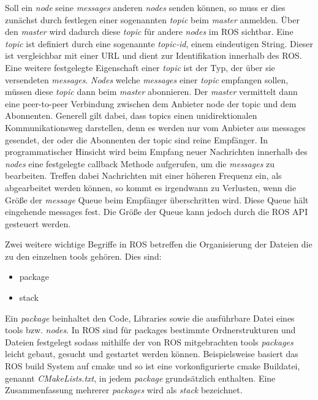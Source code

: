 Soll ein \textit{node} seine \textit{messages} anderen \textit{nodes} senden
können, so muss er dies zunächst durch festlegen einer sogenannten
\textit{topic} beim \textit{master} anmelden. Über den \textit{master} wird
dadurch diese \textit{topic} für andere \textit{nodes} im ROS sichtbar. Eine
\textit{topic} ist definiert durch eine sogenannte \textit{topic-id}, einem
eindeutigen String. Dieser ist vergleichbar mit einer URL und dient zur
Identifikation innerhalb des ROS. Eine weitere festgelegte
Eigenschaft einer \textit{topic} ist der Typ, der über sie versendeten
\textit{messages}. \textit{Nodes} welche \textit{messages} einer
\textit{topic} empfangen sollen, müssen diese \textit{topic} dann beim
\textit{master} abonnieren. Der \textit{master} vermittelt dann eine
peer-to-peer Verbindung zwischen dem Anbieter node der topic und dem
Abonnenten. Generell gilt dabei, dass topics einen unidirektionalen
Kommunikationsweg darstellen, denn es werden nur vom Anbieter aus messages
gesendet, der oder die Abonnenten der topic sind reine Empfänger. 
In programmatischer Hinsicht wird beim Empfang neuer Nachrichten innerhalb des
\textit{nodes} eine festgelegte callback Methode aufgerufen, um die
\textit{messages} zu bearbeiten. Treffen dabei Nachrichten mit einer höheren
Frequenz ein, als abgearbeitet werden können, so kommt es irgendwann zu
Verlusten, wenn die Größe der \textit{message} Queue beim Empfänger überschritten
wird. Diese Queue hält eingehende messages fest. Die Größe der Queue kann jedoch durch die ROS API gesteuert werden.  

Zwei weitere wichtige Begriffe in ROS betreffen die Organisierung der
Dateien die zu den einzelnen tools gehören. Dies sind:

\begin{itemize}
  \item package
  \item stack
\end{itemize}

Ein \textit{package} beinhaltet den Code, Libraries sowie die ausführbare Datei
eines tools bzw. \textit{nodes}.  In ROS sind für packages bestimmte
Ordnerstrukturen und Dateien festgelegt sodass mithilfe der von ROS
mitgebrachten tools \textit{packages} leicht gebaut, gesucht und gestartet
werden können. Beispielsweise basiert das ROS build System auf cmake und so ist
eine vorkonfigurierte cmake Buildatei, genannt \textit{CMakeLists.txt}, in jedem
\textit{package} grundsätzlich enthalten. Eine Zusammenfassung mehrerer
\textit{packages} wird als \textit{stack} bezeichnet. 

